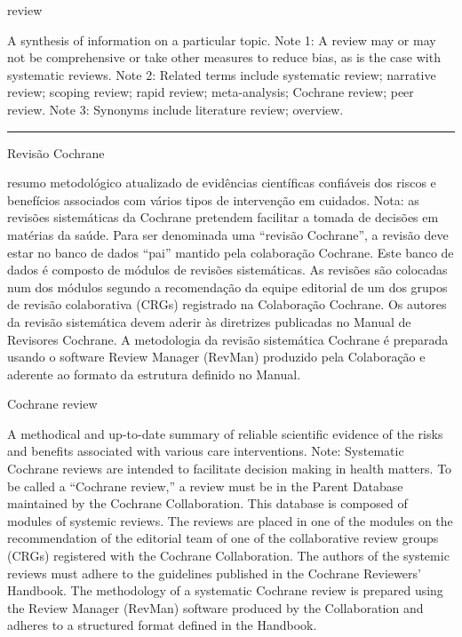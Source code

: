 \documentclass[
  openany]{book}
\begin{document}
review

A synthesis of information on a particular topic. Note 1: A review may or may not be comprehensive or take other measures to reduce bias, as is the case with systematic reviews. Note 2: Related terms include systematic review; narrative review; scoping review; rapid review; meta-analysis; Cochrane review; peer review. Note 3: Synonyms include literature review; overview.

\begin{center}\rule{0.5\linewidth}{0.5pt}\end{center}

Revisão Cochrane

resumo metodológico atualizado de evidências científicas confiáveis dos riscos e benefícios associados com vários tipos de intervenção em cuidados. Nota: as revisões sistemáticas da Cochrane pretendem facilitar a tomada de decisões em matérias da saúde. Para ser denominada uma ``revisão Cochrane'', a revisão deve estar no banco de dados ``pai'' mantido pela colaboração Cochrane. Este banco de dados é composto de módulos de revisões sistemáticas. As revisões são colocadas num dos módulos segundo a recomendação da equipe editorial de um dos grupos de revisão colaborativa (CRGs) registrado na Colaboração Cochrane. Os autores da revisão sistemática devem aderir às diretrizes publicadas no Manual de Revisores Cochrane. A metodologia da revisão sistemática Cochrane é preparada usando o software Review Manager (RevMan) produzido pela Colaboração e aderente ao formato da estrutura definido no Manual.

Cochrane review

A methodical and up-to-date summary of reliable scientific evidence of the risks and benefits associated with various care interventions. Note: Systematic Cochrane reviews are intended to facilitate decision making in health matters. To be called a ``Cochrane review,'' a review must be in the Parent Database maintained by the Cochrane Collaboration. This database is composed of modules of systemic reviews. The reviews are placed in one of the modules on the recommendation of the editorial team of one of the collaborative review groups (CRGs) registered with the Cochrane Collaboration. The authors of the systemic reviews must adhere to the guidelines published in the Cochrane Reviewers' Handbook. The methodology of a systematic Cochrane review is prepared using the Review Manager (RevMan) software produced by the Collaboration and adheres to a structured format defined in the Handbook.
\end{document}
